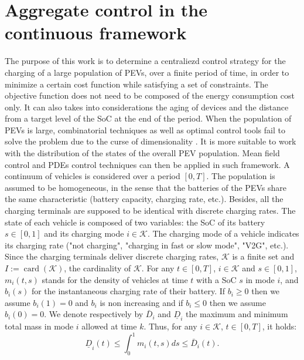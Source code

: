 \documentclass[conference]{IEEEtran}
\DeclareMathOperator{\card}{card}
\def\K{\mathcal{K}}
\begin{document}

\section{Aggregate control in the continuous framework}
\label{cont_model}

The purpose of this work is to determine a centraliezd control strategy for the charging of a large population of PEVs, over a finite period of time, in order to minimize a certain cost function while satisfying a set of constraints. The objective function does not need to be composed of the energy consumption cost only. It can also takes into considerations the aging of devices and the distance from a target level of the SoC at the end of the period. When the population of PEVs is large, combinatorial techniques as well as optimal control tools fail to solve the problem due to the curse of dimensionality \cite{bellman2015adaptive}. 
It is more suitable to work with the distribution of the states of the overall PEV population. Mean field control and PDEs control techniques can then be applied in such framework. A continuum of vehicles is considered over a period $[0,T]$. The population is assumed to be homogeneous, in the sense that the batteries of the PEVs share the same characteristic (battery capacity, charging rate, etc.). Besides, all the charging terminals are supposed to be identical with discrete charging rates. The state of each vehicle is composed of two variables: the SoC of its battery $s\in[0,1]$ and its charging mode $i\in \K $. The charging mode of a vehicle indicates its charging rate ("not charging", "charging in fast or slow mode", "V2G", etc.).
Since the charging terminals deliver discrete charging rates, $\K $ is a finite set and $I:=\card(\K )$, the cardinality of $\K$. For any $t\in[0,T]$, $i\in\K $ and $s\in[0,1]$, $m_i(t,s)$ stands for the density of vehicles at time $t$ with a SoC $s$ in mode $i$, and $b_i(s)$ for the instantaneous charging rate of their battery. If $b_i\geq0$ then we assume $b_i(1)=0$ and $b_i$ is non increasing and
if $b_i\leq0$ then we assume $b_i(0)=0$. We denote respectively by $\bar{D}_i$ and $\underline{D}_i$ the maximum and minimum total mass in mode $i$ allowed at time $k$.
Thus, for any $i\in\K$, $t\in[0,T]$, it holds:
\begin{equation}
\label{ineq cons}
\underline{D}_i(t)\leq
 \int_0^1m_i(t,s)ds\leq \bar{D}_i(t).
\end{equation}
\end{document}
